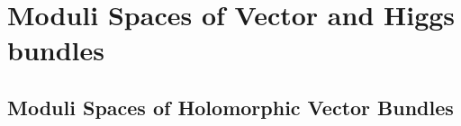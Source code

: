 \chapter{Moduli Spaces of Vector and Higgs bundles}

\section{Moduli Spaces of Holomorphic Vector Bundles}

